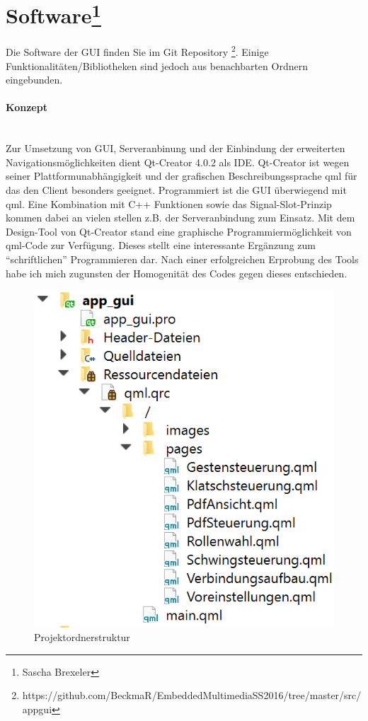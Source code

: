 \section[Software]{Software\footnote{Sascha Brexeler}}
\label{guiSoftware}
Die Software der GUI finden Sie im Git Repository \footnote{https://github.com/BeckmaR/EmbeddedMultimediaSS2016/tree/master/src/app\textunderscore gui}. Einige Funktionalitäten/Bibliotheken sind jedoch aus benachbarten Ordnern eingebunden.

\paragraph{Konzept}$\;$\\
Zur Umsetzung von GUI, Serveranbinung und der Einbindung der erweiterten Navigationsmöglichkeiten dient Qt-Creator 4.0.2 als IDE. Qt-Creator ist wegen seiner Plattformunabhängigkeit und der grafischen Beschreibungssprache qml für das den Client besonders geeignet. Programmiert ist die GUI überwiegend mit qml. Eine Kombination mit C++ Funktionen sowie das Signal-Slot-Prinzip kommen dabei an vielen stellen z.B. der Serveranbindung zum Einsatz. Mit dem Design-Tool von Qt-Creator stand eine graphische Programmiermöglichkeit von qml-Code zur Verfügung. Dieses stellt eine interessante Ergänzung zum "`schriftlichen"' Programmieren dar. Nach einer erfolgreichen Erprobung des Tools habe ich mich zugunsten der Homogenität des Codes gegen dieses entschieden.
\begin{figure}[ht!]
	\centering
	\includegraphics[scale=0.8]{GUI/Bilder/Projektordnerstruktur.PNG}
	\caption{Projektordnerstruktur {\tiny}}
	\label{client:Projektordnerstruktur}
\end{figure}


